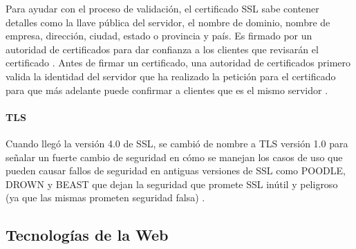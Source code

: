 Para ayudar con el proceso de validación, el certificado SSL sabe contener detalles como la llave pública del servidor, el nombre de dominio, nombre de empresa, dirección, ciudad, estado o provincia y país. Es firmado por un autoridad de certificados para dar confianza a los clientes que revisarán el certificado \citep{info.SSL.com-SSL}. Antes de firmar un certificado, una autoridad de certificados primero valida la identidad del servidor que ha realizado la petición para el certificado para que más adelante puede confirmar a clientes que es el mismo servidor \citep{GlobalSign-SSL}.

\paragraph{TLS}
Cuando llegó la versión 4.0 de SSL, se cambió de nombre a TLS versión 1.0 \citep{DigiCert-SSL} para señalar un fuerte cambio de seguridad en cómo se manejan los casos de uso que pueden causar fallos de seguridad en antiguas versiones de SSL como POODLE, DROWN y BEAST que dejan la seguridad que promete SSL inútil y peligroso (ya que las mismas prometen seguridad falsa) \citep{LuxSci-SSL-vs-TLS} \citep{GlobalSign-SSL-vs-TLS}.

\subsection{Tecnologías de la Web}

